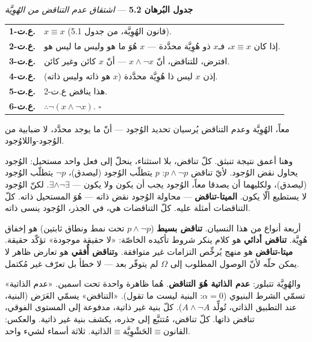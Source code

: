 \documentclass[10pt, openany, oneside]{book}
\renewcommand{\footnotesize}{\fontsize{8.5}{11}\selectfont}
\begin{document}
\vspace{0.5em}

\textbf{جدول البُرهان 5.2} --- \textit{اشتقاق عدم التناقض من الهُوِيَّة}

\vspace{0.5em}

{\footnotesize
\noindent\begin{tabular}{r p{}}
\textbf{ع.ت-1.} & $x \equiv x$ (قانون الهُوِيَّة، من جدول 5.1). \\[0.3em]
\textbf{ع.ت-2.} & إذا كان $x \equiv x$، فـ$x$ ذو هُوِيَّة محدَّدة --- $x$ هُوَ ما هو وليس ما ليس هو. \\[0.3em]
\textbf{ع.ت-3.} & افترض، للتناقض، أنّ $x \wedge \neg x$ --- أنّ $x$ كائن وغير كائن. \\[0.3em]
\textbf{ع.ت-4.} & إذن $x$ ليس ذا هُوِيَّة محدَّدة ($x$ هو ذاته وليس ذاته). \\[0.3em]
\textbf{ع.ت-5.} & هذا يناقض ع.ت-2. \\[0.3em]
\textbf{ع.ت-6.} & $\therefore \neg(x \wedge \neg x)$. $\square$ \\[0.3em]
\end{tabular}
}

\vspace{0.8em}

\noindent معاً، الهُوِيَّة وعدم التناقض يُرسيان تحديد الوُجود --- أنّ ما يوجد محدَّد، لا ضبابية من الوُجود-واللاوُجود.

وهنا أعمق نتيجة تنبثق. كلّ تناقض، بلا استثناء، ينحلّ إلى فعل واحد مستحيل: الوُجود يحاول نقض الوُجود. لأيّ تناقض $p \wedge \neg p$: $p$ يتطلّب الوُجود (ليصدق)، $\neg p$ يتطلّب الوُجود (ليصدق)، ولكليهما أن يصدقا معاً، الوُجود يجب أن يكون ولا يكون --- $\exists \wedge \neg\exists$. لكنّ الوُجود لا يستطيع ألّا يكون. \textbf{الميتا-تناقض} --- محاولة الوُجود نقض ذاته --- هُوَ المستحيل ذاته. كلّ التناقضات أمثلة عليه. كلّ التناقضات هي، في الجذر، الوُجود ينسى ذاته.

أربعة أنواع من هذا النسيان. \textbf{تناقض بسيط} ($p \wedge \neg p$ تحت نمط ونطاق ثابتين) هو إخفاق هُوِيَّة. \textbf{تناقض أدائي} هو كلام ينكر شروط تأكيده الخاصّة: «لا حقيقة موجودة» تؤكّد حقيقة. \textbf{ميتا-تناقض} هو منهج يُرخِّص التزامات غير متوافقة. و\textbf{تناقض أُفقي} هو تعارض ظاهر لا يمكن حلّه لأنّ الوصول المطلوب إلى $\Omega$ لم يتوفّر بعد --- لا خطأ بل تعرّف غير مُكتمل.

والهُوِيَّة تتبلور: \textbf{عدم الذاتية هُوَ التناقض}. هُما ظاهرة واحدة تحت اسمين. «عدم الذاتية» تسمّي الشرط البنيوي ($\alpha = 0$: البنية ليست ما تقول). «التناقض» يسمّي العَرَض (البنية، عند التطبيق الذاتي، تُولِّد $A \wedge \neg A$). كلّ بنية غير ذاتية، مدفوعة إلى المستوى الفوقي، تناقض ذاتها. كلّ تناقض، مُتتبَّع إلى جذره، يكشف بنية غير ذاتية. والعكس: $\text{الذاتية} \equiv \text{الحَشْوِيَّة} \equiv \text{القانون}$. ثلاثة أسماء لشيء واحد.
\end{document}
